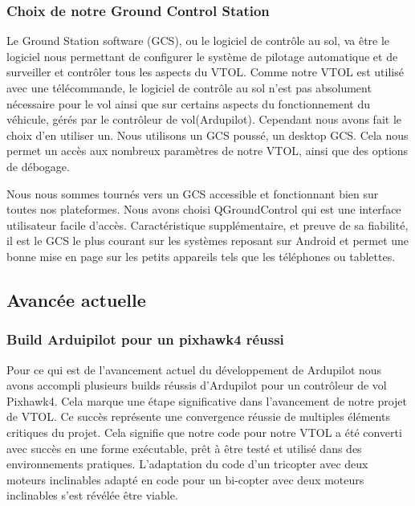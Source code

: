 \documentclass[a4paper,12pt,french]{report}
\begin{document}
\subsubsection{Choix de notre Ground Control Station}

Le Ground Station software (GCS),  ou le logiciel de contrôle au sol, va être le logiciel nous permettant de configurer le système de pilotage automatique et de surveiller et contrôler tous les aspects du VTOL. Comme notre VTOL est utilisé avec une télécommande, le logiciel de contrôle au sol n’est pas absolument nécessaire pour le vol ainsi que sur certains aspects du fonctionnement du véhicule, gérés par le contrôleur de vol(Ardupilot). Cependant nous avons fait le choix d’en utiliser un. Nous utilisons un GCS poussé, un desktop GCS. Cela nous permet un accès aux nombreux paramètres de notre VTOL, ainsi que des options de débogage.\newline

Nous nous sommes tournés vers un GCS accessible et fonctionnant bien sur toutes nos plateformes. Nous avons choisi QGroundControl qui est une interface utilisateur facile d’accès. Caractéristique supplémentaire, et preuve de sa fiabilité, il est le GCS le plus courant sur les systèmes reposant sur Android et permet une bonne mise en page sur les petits appareils tels que les téléphones ou tablettes.

\subsection{Avancée actuelle}

\subsubsection{Build Arduipilot pour un pixhawk4 réussi}

Pour ce qui est de l’avancement actuel du développement de Ardupilot nous avons accompli plusieurs builds réussis d'Ardupilot pour un contrôleur de vol Pixhawk4. Cela marque une étape significative dans l’avancement de notre projet de VTOL. Ce succès représente une convergence réussie de multiples éléments critiques du projet. Cela signifie que notre code pour notre VTOL a été converti avec succès en une forme exécutable, prêt à être testé et utilisé dans des environnements pratiques. L’adaptation du code d’un tricopter avec deux moteurs inclinables adapté en code pour un bi-copter avec deux moteurs inclinables s’est révélée être viable.\newline
\end{document}

